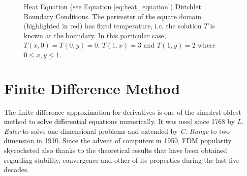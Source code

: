     \begin{center}
	\begin{figure}
    	 \label{fig:heat2d_bc}
    	\caption[Heat Equation - Dirichlet Boundary Conditions]{Heat Equation (see Equation \ref{eq:heat_equation}) Dirichlet Boundary Conditions. The perimeter of the square domain (highlighted in red) has fixed temperature, i.e. the solution $T$ is known at the boundary. In this particular case, $T(x,0)=T(0,y)=0$, $T(1,x)=3$ and $T(1,y)=2$ where $0\leq x,y\leq 1$. }\label{fig:heat2d_bc}
	\end{figure}
\end{center} 

    \section{Finite Difference Method}
The finite difference approximation for derivatives is one of the simplest oldest method to solve differential equations numerically. It was used since 1768 by \textit{L. Euler} to solve one dimensional problems and extended by \textit{C. Runge} to two dimension in 1910. Since the advent of computers in 1950, FDM  popularity skyrocketed also thanks to the theoretical results that have been obtained regarding stability, convergence and other of its properties during the last five decades.

